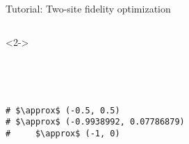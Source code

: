 \begin{frame}[fragile]{Tutorial: Two-site fidelity optimization}
\begin{columns}
\begin{column}{5cm}
\begin{onlyenv}<2->

\begin{lstlisting}[style=julia, numbers=none, mathescape, basicstyle=\small]




# $\approx$ (-0.5, 0.5)
# $\approx$ (-0.9938992, 0.07786879)
#     $\approx$ (-1, 0)
\end{lstlisting}

\end{onlyenv}

\end{column}

\end{columns}

\end{frame}
